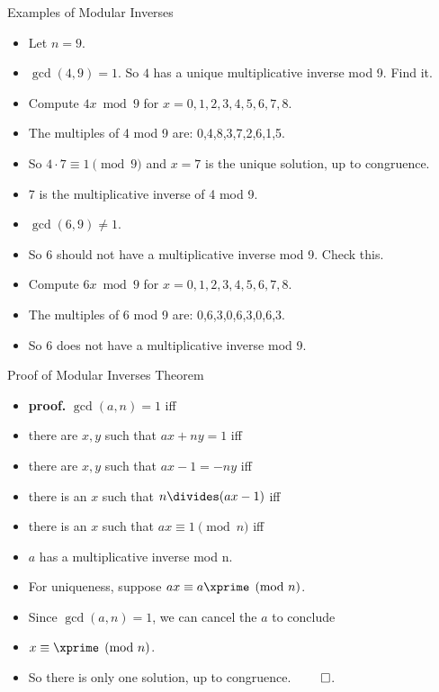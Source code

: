 \documentclass{beamer}
\begin{document}
\begin{frame}{Examples of Modular Inverses}
\begin{itemize}
  \item Let $n=9$.
  \item $\gcd(4,9)=1$. So $4$ has a unique multiplicative inverse mod 9. Find it.
  \item Compute $4x \bmod 9$ for $x=0,1,2,3,4,5,6,7,8$.
  \item The multiples of 4 mod 9 are: 0,4,8,3,7,2,6,1,5.
  \item So $4\cdot 7 \equiv 1 \pmod 9$ and $x=7$ is the unique solution, up to congruence.
  \item 7 is the multiplicative inverse of 4 mod 9.
  \item $\gcd(6,9) \not= 1$.
  \item So 6 should not have a multiplicative inverse mod 9. Check this.
  \item Compute $6x\bmod 9$ for $x=0,1,2,3,4,5,6,7,8$.
  \item The multiples of 6 mod 9 are: 0,6,3,0,6,3,0,6,3.
  \item So 6 does not have a multiplicative inverse mod 9.
\end{itemize}
\end{frame}

\begin{frame}{Proof of Modular Inverses Theorem}
\begin{itemize}
  \item \textbf{proof.} $\gcd(a,n)=1$ iff
  \item there are $x,y$ such that $ax + ny = 1$ iff
  \item there are $x,y$ such that $ax - 1 = -ny$ iff
  \item there is an $x$ such that $n\divides (ax -1)$ iff
  \item there is an $x$ such that $ax \equiv 1 \pmod n$ iff
  \item $a$ has a multiplicative inverse mod n.
  \item For uniqueness, suppose $ax \equiv a\xprime \pmod n$.
  \item Since $\gcd(a, n)=1$, we can cancel the $a$ to conclude
  \item $x\equiv \xprime \pmod n$.
  \item So there is only one solution, up to congruence. $\qed$.
\end{itemize}
\end{frame}
\end{document}
